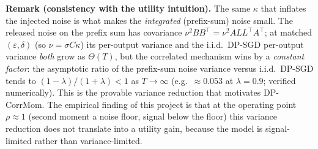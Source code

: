 \par\smallskip\noindent\textbf{Remark (consistency with the utility intuition).}\quad 
The same $\kappa$ that inflates the injected noise is what makes the \emph{integrated} (prefix-sum)
noise small. The released noise on the prefix sum has covariance $\nu^2 BB^\top=\nu^2 ALL^\top A^\top$;
at matched $(\varepsilon,\delta)$ (so $\nu=\sigma C\kappa$) its per-output variance and the
i.i.d.\ DP-SGD per-output variance \emph{both} grow as $\Theta(T)$, but the correlated mechanism wins by
a \emph{constant factor}: the asymptotic ratio of the prefix-sum noise variance versus i.i.d.\ DP-SGD
tends to $(1-\lambda)/(1+\lambda)<1$ as $T\to\infty$ (e.g.\ $\approx0.053$ at $\lambda=0.9$; verified
numerically). This is the provable variance reduction that motivates DP-CorrMom. The empirical finding
of this project is that at the operating point $\rho\approx1$ (second moment a noise floor, signal below
the floor) this variance reduction does not translate into a utility gain, because the model is
signal-limited rather than variance-limited.